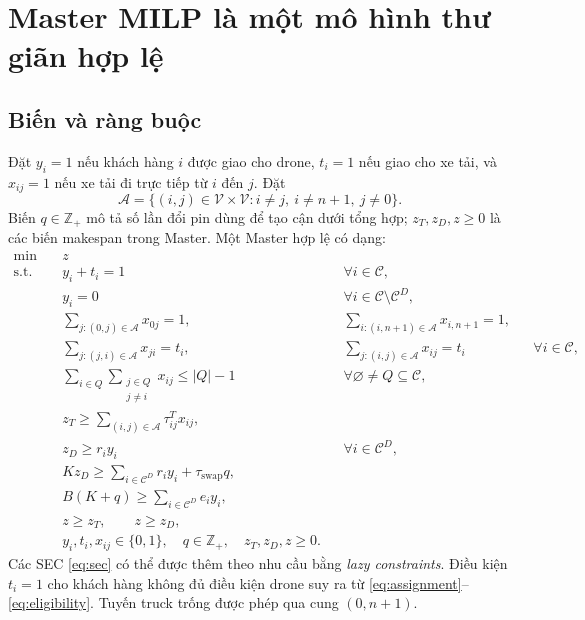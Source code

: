 \documentclass[11pt,a4paper]{article}
\theoremstyle{definition}
\theoremstyle{plain}
\theoremstyle{remark}
\newcommand{\C}{\mathcal C}
\newcommand{\CD}{\mathcal C^D}
\newcommand{\V}{\mathcal V}
\newcommand{\A}{\mathcal A}
\newcommand{\sw}{\tau_{\mathrm{swap}}}
\begin{document}
\section{Master MILP là một mô hình thư giãn hợp lệ}
\subsection{Biến và ràng buộc}
Đặt $y_i=1$ nếu khách hàng $i$ được giao cho drone, $t_i=1$ nếu giao cho xe tải, và $x_{ij}=1$ nếu xe tải đi trực tiếp từ $i$ đến $j$. Đặt
\[
\A=\{(i,j)\in\V\times\V:i\ne j,\ i\ne n+1,\ j\ne0\}.
\]
Biến $q\in\mathbb Z_+$ mô tả số lần đổi pin dùng để tạo cận dưới tổng hợp; $z_T,z_D,z\ge0$ là các biến makespan trong Master. Một Master hợp lệ có dạng:
\begin{align}
\min\quad &z\label{eq:masterobj}\\
\text{s.t.}\quad
& y_i+t_i=1 &&\forall i\in\C,\label{eq:assignment}\\
& y_i=0 &&\forall i\in\C\setminus\CD,\label{eq:eligibility}\\
&\sum_{j:(0,j)\in\A}x_{0j}=1,
&&\sum_{i:(i,n+1)\in\A}x_{i,n+1}=1,\label{eq:depot}\\
&\sum_{j:(j,i)\in\A}x_{ji}=t_i,
&&\sum_{j:(i,j)\in\A}x_{ij}=t_i
&&\forall i\in\C,\label{eq:degree}\\
&\sum_{i\in Q}\sum_{\substack{j\in Q\\j\ne i}}x_{ij}\le |Q|-1
&&\forall\varnothing\ne Q\subseteq\C,\label{eq:sec}\\
& z_T\ge\sum_{(i,j)\in\A}\tau^T_{ij}x_{ij},\label{eq:truck-time}\\
& z_D\ge r_i y_i &&\forall i\in\CD,\label{eq:single}\\
& Kz_D\ge\sum_{i\in\CD}r_i y_i+\sw q,\label{eq:workload}\\
& B(K+q)\ge\sum_{i\in\CD}e_i y_i,\label{eq:energy}\\
& z\ge z_T,\qquad z\ge z_D,\label{eq:links}\\
& y_i,t_i,x_{ij}\in\{0,1\},\quad q\in\mathbb Z_+,\quad z_T,z_D,z\ge0.
\end{align}
Các SEC \eqref{eq:sec} có thể được thêm theo nhu cầu bằng \emph{lazy constraints}. Điều kiện $t_i=1$ cho khách hàng không đủ điều kiện drone suy ra từ \eqref{eq:assignment}--\eqref{eq:eligibility}. Tuyến truck trống được phép qua cung $(0,n+1)$.
\end{document}
